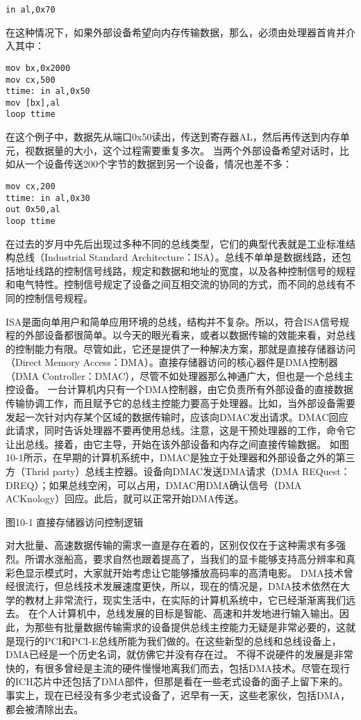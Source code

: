 \documentclass[12pt]{article}
\begin{document}
\begin{CJK}{UTF8}{gbsn}
\begin{verbatim}
in al,0x70
\end{verbatim}

在这种情况下，如果外部设备希望向内存传输数据，那么，必须由处理器首肯并介入其中：
\begin{verbatim}
mov bx,0x2000
mov cx,500
ttime: in al,0x50
mov [bx],al
loop ttime
\end{verbatim}
在这个例子中，数据先从端口0x50读出，传送到寄存器AL，然后再传送到内存单元，视数据量的大小，这个过程需要重复多次。
当两个外部设备希望对话时，比如从一个设备传送200个字节的数据到另一个设备，情况也差不多：

\begin{verbatim}
mov cx,200
ttime: in al,0x30
out 0x50,al
loop ttime
\end{verbatim}

在过去的岁月中先后出现过多种不同的总线类型，它们的典型代表就是工业标准结构总线（Industrial Standard Architecture：ISA）。总线不单单是数据线路，还包括地址线路的控制信号线路，规定和数据和地址的宽度，以及各种控制信号的规程和电气特性。控制信号规定了设备之间互相交流的协同的方式，而不同的总线有不同的控制信号规程。

ISA是面向单用户和简单应用环境的总线，结构并不复杂。所以，符合ISA信号规程的外部设备都很简单。以今天的眼光看来，或者以数据传输的效能来看，对总线的控制能力有限。尽管如此，它还是提供了一种解决方案，那就是直接存储器访问（Direct Memory Access：DMA）。直接存储器访问的核心器件是DMA控制器（DMA Controller：DMAC），尽管不如处理器那么神通广大，但也是一个总线主控设备。
一台计算机内只有一个DMA控制器，由它负责所有外部设备的直接数据传输协调工作，而且赋予它的总线主控能力要高于处理器。比如，当外部设备需要发起一次针对内存某个区域的数据传输时，应该向DMAC发出请求。DMAC回应此请求，同时告诉处理器不要再使用总线。注意，这是干预处理器的工作，命令它让出总线。接着，由它主导，开始在该外部设备和内存之间直接传输数据。
如图10-1所示，在早期的计算机系统中，DMAC是独立于处理器和外部设备之外的第三方（Thrid party）总线主控器。设备向DMAC发送DMA请求（DMA REQuest：DREQ）；如果总线空闲，可以占用，DMAC用DMA确认信号（DMA ACKnology）回应。此后，就可以正常开始DMA传送。
 
图10-1  直接存储器访问控制逻辑

对大批量、高速数据传输的需求一直是存在着的，区别仅仅在于这种需求有多强烈。所谓水涨船高，要求自然也跟着提高了，当我们的显卡能够支持高分辨率和真彩色显示模式时，大家就开始考虑让它能够播放高码率的高清电影。
DMA技术曾经很流行，但总线技术发展速度更快，所以，现在的情况是，DMA技术依然在大学的教材上非常流行，现实生活中，在实际的计算机系统中，它已经渐渐离我们远去。
在个人计算机中，总线发展的目标是智能、高速和并发地进行输入输出。因此，为那些有批量数据传输需求的设备提供总线主控能力无疑是非常必要的，这就是现行的PCI和PCI-E总线所能为我们做的。在这些新型的总线和总线设备上，DMA已经是一个历史名词，就仿佛它并没有存在过。
不得不说硬件的发展是非常快的，有很多曾经是主流的硬件慢慢地离我们而去，包括DMA技术。尽管在现行的ICH芯片中还包括了DMA部件，但那是看在一些老式设备的面子上留下来的。事实上，现在已经没有多少老式设备了，迟早有一天，这些老家伙，包括DMA，都会被清除出去。

\end{CJK}
\end{document}
